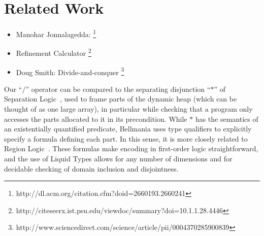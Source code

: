\section{Related Work}
\label{related}

\begin{itemize}
\color{Gray}
\item Manohar Jonnalagedda: \cite{OOPSLA14/Jonnalagedda} \footnote{http://dl.acm.org/citation.cfm?doid=2660193.2660241}
\item Refinement Calculator \cite{TPHOLs96/Butler} \footnote{http://citeseerx.ist.psu.edu/viewdoc/summary?doi=10.1.1.28.4446}
\item Doug Smith: Divide-and-conquer\cite{AI85/Smith} \footnote{http://www.sciencedirect.com/science/article/pii/0004370285900839}
\end{itemize}

Our ``$\big/$'' operator can be compared to the separating disjunction ``$\ast$'' of Separation Logic~\cite{LICS02/Reynolds},
used to frame parts of the dynamic heap (which can be thought of as one large array),
in particular while checking that a program only accesses the parts allocated to it in its precondition.
While $\ast$ has the semantics of an existentially quantified predicate, Bellmania uses type qualifiers
to explicitly specify a formula defining each part. In this sense, it is more closely related to
Region Logic~\cite{ECOOP08/Banerjee}. These formulas make encoding in first-order logic straightforward,
and the use of Liquid Types allows for any number of dimensions and for decidable checking of domain inclusion
and disjointness.
